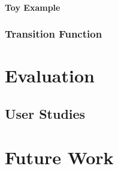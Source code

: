 \documentclass{article}
\begin{document}
\paragraph{Toy Example}
\subsubsection{Transition Function}


\section{Evaluation}

\subsection{User Studies}

\section{Future Work}
\end{document}

